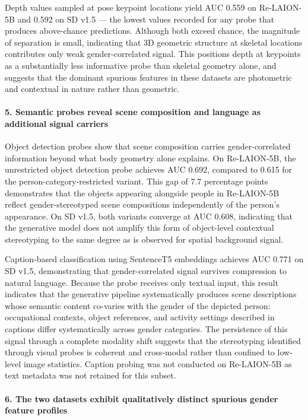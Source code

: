 Depth values sampled at pose keypoint locations yield AUC 0.559 on Re-LAION-5B and 0.592
on SD v1.5 --- the lowest values recorded for any probe that produces above-chance
predictions. Although both exceed chance, the magnitude of separation is small, indicating
that 3D geometric structure at skeletal locations contributes only weak gender-correlated
signal. This positions depth at keypoints as a substantially less informative probe than
skeletal geometry alone, and suggests that the dominant spurious features in these
datasets are photometric and contextual in nature rather than geometric.

\paragraph{5. Semantic probes reveal scene composition and language as additional signal carriers}

Object detection probes show that scene composition carries gender-correlated information
beyond what body geometry alone explains. On Re-LAION-5B, the unrestricted object
detection probe achieves AUC 0.692, compared to 0.615 for the person-category-restricted
variant. This gap of 7.7 percentage points demonstrates that the objects appearing
alongside people in Re-LAION-5B reflect gender-stereotyped scene compositions
independently of the person's appearance. On SD v1.5, both variants converge at AUC
0.608, indicating that the generative model does not amplify this form of object-level
contextual stereotyping to the same degree as is observed for spatial background signal.

Caption-based classification using SentenceT5 embeddings achieves AUC 0.771 on SD v1.5,
demonstrating that gender-correlated signal survives compression to natural language.
Because the probe receives only textual input, this result indicates that the generative
pipeline systematically produces scene descriptions whose semantic content co-varies with
the gender of the depicted person: occupational contexts, object references, and activity
settings described in captions differ systematically across gender categories. The
persistence of this signal through a complete modality shift suggests that the stereotyping
identified through visual probes is coherent and cross-modal rather than confined to
low-level image statistics. Caption probing was not conducted on Re-LAION-5B as text
metadata was not retained for this subset.

\paragraph{6. The two datasets exhibit qualitatively distinct spurious gender feature profiles}

